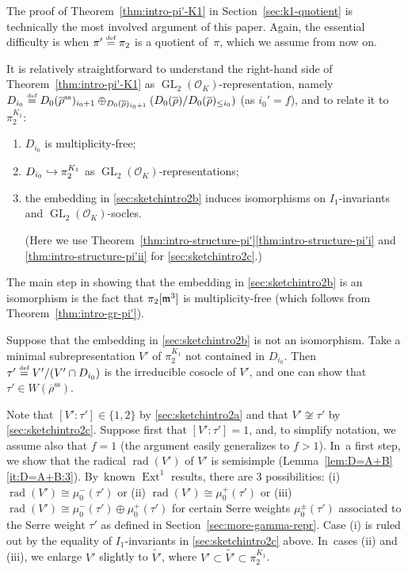 \documentclass[JEP,XML,SOM,Unicode,NoFloatCountersInSection, NoEqCountersInSection,published]{cedram}
\newenvironment{enumeratea}
{\bgroup\def\theenumi{\alph{enumi}}\begin{enumerate}}
{\end{enumerate}\egroup}
\newcommand\hto{\mathrel{\lhook\joinrel\to}}
\let\wt\widetilde
\renewcommand{\theenumi}{\roman{enumi}}
\newcommand{\defeq}{\stackrel{\textrm{\tiny{\upshape{def}}}}{=}}
\newcommand{\cO}{\mathcal{O}}
\renewcommand{\ss}{\mathrm{ss}}
\newcommand{\brho}{\overline{\rho}}
\DeclareMathOperator{\Ext}{Ext}
\DeclareMathOperator{\GL}{GL}
\DeclareMathOperator{\rad}{rad}
\theoremstyle{plain}
\theoremstyle{definition}
\begin{document}
The proof of Theorem~\ref{thm:intro-pi'-K1} in Section~\ref{sec:k1-quotient} is technically the most involved argument of this paper.
Again, the essential difficulty is when $\pi' \defeq \pi_2$ is a quotient of~$\pi$, which we assume from now on.

It is relatively straightforward to understand the right-hand side of Theorem~\ref{thm:intro-pi'-K1} as $\GL_2(\cO_K)$-representation, namely $D_{i_0} \defeq D_0(\brho^\ss)_{i_0+1} \oplus_{D_0(\brho)_{i_0+1}} (D_0(\brho)/D_0(\brho)_{\le i_0})$ (as $i_0' = f$), and to relate it to $\pi_2^{K_1}$:
\begin{enumeratea}
\item\label{sec:sketchintro2a} $D_{i_0}$ is multiplicity-free;
\item\label{sec:sketchintro2b} $D_{i_0} \hto \pi_2^{K_1}$ as $\GL_2(\cO_K)$-representations;
\item\label{sec:sketchintro2c} the embedding in \eqref{sec:sketchintro2b} induces isomorphisms on $I_1$-invariants and $\GL_2(\cO_K)$-socles.\par\noindent
(Here we use Theorem~\ref{thm:intro-structure-pi'}\eqref{thm:intro-structure-pi'i} and \eqref{thm:intro-structure-pi'ii} for \eqref{sec:sketchintro2c}.)
\end{enumeratea}

The main step in showing that the embedding in \eqref{sec:sketchintro2b} is an isomorphism is the fact that $\pi_2[\mathfrak{m}^3]$ is multiplicity-free (which follows from Theorem~\ref{thm:intro-gr-pi'}).

Suppose that the embedding in \eqref{sec:sketchintro2b} is not an isomorphism.
Take a minimal subrepresentation $V'$ of $\pi_2^{K_1}$ not contained in $D_{i_0}$.
Then $\tau'\defeq V'/(V'\cap D_{i_0})$ is the irreducible cosocle of $V'$, and one can show that $\tau' \in W(\brho^\ss)$.

Note that $[V':\tau'] \in \{1,2\}$ by \eqref{sec:sketchintro2a} and that $V' \not\cong \tau'$ by \eqref{sec:sketchintro2c}.
Suppose first that $[V':\tau'] = 1$, and, to simplify notation, we assume also that $f = 1$ (the argument easily generalizes to $f>1$). In~a first step, we show that the radical $\rad(V')$ of $V'$ is semisimple (Lemma~\ref{lem:D=A+B}\eqref{it:D=A+B:3}). By~known $\Ext^1$ results, there are $3$ possibilities: (i) $\rad(V') \cong \mu_0^-(\tau')$ or (ii) $\rad(V') \cong \mu_0^+(\tau')$ or (iii) $\rad(V') \cong \mu_0^-(\tau') \oplus \mu_0^+(\tau')$ for certain Serre weights $\mu_0^{\pm}(\tau')$ associated to the Serre weight $\tau'$ as defined in Section~\ref{sec:more-gamma-repr}.
Case (i) is ruled out by the equality of $I_1$-invariants in \eqref{sec:sketchintro2c} above. In~cases (ii) and (iii), we enlarge $V'$ slightly to $\wt{V'}$, where $V' \subset \wt{V'} \subset \pi_2^{K_1}$.
\end{document}
